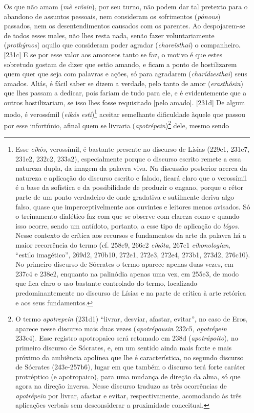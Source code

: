 Os que não amam (\emph{mè} \emph{erôsin}), por seu turno, não podem dar
tal pretexto para o abandono de assuntos pessoais, nem consideram os
sofrimentos (\emph{pónous}) passados, nem os desentendimentos causados
com os parentes. Ao despojarem-se de todos esses males, não lhes resta
nada, senão fazer voluntariamente (\emph{prothýmos}) aquilo que
consideram poder agradar (\emph{chareîsthai}) o companheiro. {[}231c{]}
E se por esse valor aos amorosos tanto se faz, o motivo é que estes
sobretudo gostam de dizer que estão amando, e ficam a ponto de
hostilizarem quem quer que seja com palavras e ações, só para agradarem
(\emph{charídzesthai}) seus amados. Aliás, é fácil saber se dizem a
verdade, pelo tanto de amor (\emph{erasthôsin}) que lhes passam a
dedicar, pois fariam de tudo para ele, e é evidentemente que a outros
hostilizariam, se isso lhes fosse requisitado {[}pelo amado{]}.
{[}231d{]} De algum modo, é verossímil (\emph{eikós esti})\footnote{Esse
  \emph{eikòs}, verossímil, é bastante presente no discurso de Lísias
  (229e1, 231c7, 231e2, 232c2, 233a2), especialmente porque o discurso
  escrito remete a essa natureza dupla, da imagem da palavra viva. Na
  discussão posterior acerca da natureza e aplicação do discurso escrito
  e falado, ficará claro que o verossímil é a base da sofística e da
  possibilidade de produzir o engano, porque o rétor parte de um ponto
  verdadeiro de onde gradativa e sutilmente deriva algo falso, quase que
  imperceptivelmente aos ouvintes e leitores menos avisados. Só o
  treinamento dialético faz com que se observe com clareza como e quando
  isso ocorre, sendo um antídoto, portanto, a esse tipo de aplicação do
  \emph{lógos}. Nesse contexto de crítica aos recursos e fundamentos da
  arte da palavra há a maior recorrência do termo (cf. 258c9, 266e2
  \emph{eikóta}, 267c1 \emph{eikonologían}, ``estilo imagético'', 269d2,
  270b10, 272e1, 272e3, 272e4, 273b1, 273d2, 276c10). No primeiro
  discurso de Sócrates o termo aparece apenas duas vezes, em 237c4 e
  238e2, enquanto na palinódia apenas uma vez, em 255e3, de modo que
  fica claro o uso bastante controlado do termo, localizado
  predominantemente no discurso de Lísias e na parte de crítica à arte
  retórica e aos seus fundamentos.} aceitar semelhante dificuldade
àquele que passou por esse infortúnio, afinal quem se livraria
(\emph{apotrépein})\footnote{O termo \emph{apotrepein} (231d1) ``livrar,
  desviar, afastar, evitar'', no caso de Eros, aparece nesse discurso
  mais duas vezes (\emph{apotrépousin} 232c5, \emph{apotrépein} 233c4).
  Esse registro apotropaico será retomado em 238d (\emph{apotrápoito}),
  no primeiro discurso de Sócrates, e, em um sentido ainda mais fonte e
  mais próximo da ambiência apolínea que lhe é característica, no
  segundo discurso de Sócrates (243e-257b6), lugar em que também o
  discurso terá forte caráter protréptico (e apotropaico), para uma
  mudança de direção da alma, só que agora na direção inversa. Nesse
  discurso traduzo as três ocorrências de \emph{apotrépein} por livrar,
  afastar e evitar, respectivamente, acomodando às três aplicações
  verbais sem desconsiderar a proximidade conceitual.} dele, mesmo sendo
